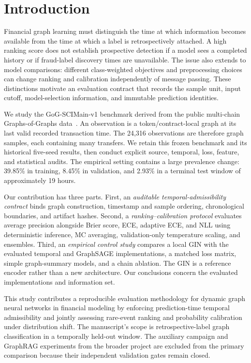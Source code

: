 \documentclass[applsci,article,submit,pdftex,moreauthors]{Definitions/mdpi}
\begin{document}
\setlength{\headheight}{26pt}

\section{Introduction}
Financial graph learning must distinguish the time at which information becomes available from the time at which a label is retrospectively attached. A high ranking score does not establish prospective detection if a model sees a completed history or if fraud-label discovery times are unavailable. The issue also extends to model comparisons: different class-weighted objectives and preprocessing choices can change ranking and calibration independently of message passing. These distinctions motivate an evaluation contract that records the sample unit, input cutoff, model-selection information, and immutable prediction identities.

We study the GoG-SCIMain-v1 benchmark derived from the public multi-chain Graphs-of-Graphs data~\cite{luo2024multichain}. An observation is a token/contract-local graph at its last valid recorded transaction time. The 24,316 observations are therefore graph samples, each containing many transfers. We retain this frozen benchmark and its historical five-seed results, then conduct explicit source, temporal, loss, feature, and statistical audits. The empirical setting contains a large prevalence change: 39.85\% in training, 8.45\% in validation, and 2.93\% in a terminal test window of approximately 19 hours.

Our contribution has three parts. First, an \emph{auditable temporal-admissibility contract} binds graph construction, timestamp and sample ordering, chronological boundaries, and artifact hashes. Second, a \emph{ranking--calibration protocol} evaluates average precision alongside Brier score, ECE, adaptive ECE, and NLL using deterministic inference, MC averaging, validation-only temperature scaling, and ensembles. Third, an \emph{empirical control study} compares a local GIN with the evaluated temporal and GraphSAGE implementations, a matched loss matrix, simple graph-summary models, and a chain ablation. The GIN is a reference encoder rather than a new architecture. Our conclusions concern the evaluated implementations and information set.

This study contributes a reproducible evaluation methodology for dynamic graph neural networks in financial modeling by enforcing prediction-time temporal admissibility and jointly assessing rare-event ranking and probability calibration under distribution shift. The manuscript's scope is retrospective-label graph classification in a temporally held-out window. The auxiliary campaign and GraphRAG experiments from the broader project are excluded from the primary comparison because their independent validation gates remain closed.
\end{document}
